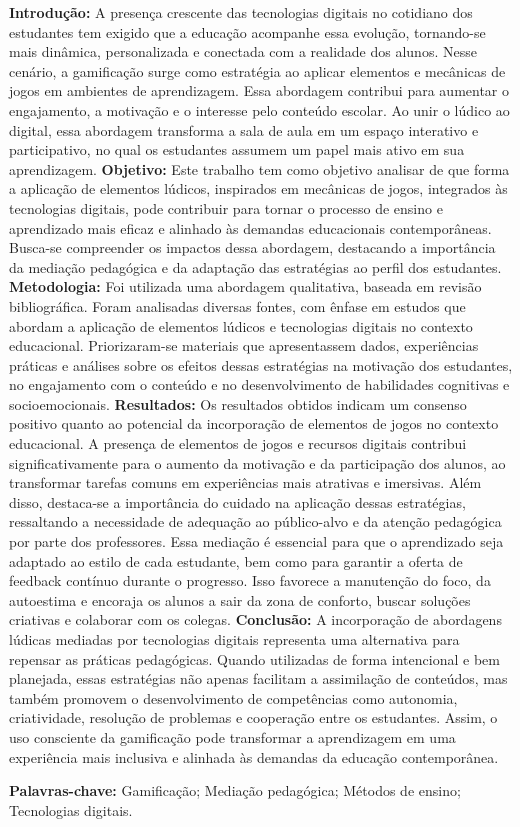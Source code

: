 \documentclass[12pt,a4paper]{article}
\begin{document}
\noindent
\textbf{Introdução:} A presença crescente das tecnologias digitais no cotidiano dos estudantes tem exigido que a educação acompanhe essa evolução, tornando-se mais dinâmica, personalizada e conectada com a realidade dos alunos. Nesse cenário, a gamificação surge como estratégia ao aplicar elementos e mecânicas de jogos em ambientes de aprendizagem. Essa abordagem contribui para aumentar o engajamento, a motivação e o interesse pelo conteúdo escolar. Ao unir o lúdico ao digital, essa abordagem transforma a sala de aula em um espaço interativo e participativo, no qual os estudantes assumem um papel mais ativo em sua aprendizagem. \textbf{Objetivo:} Este trabalho tem como objetivo analisar de que forma a aplicação de elementos lúdicos, inspirados em mecânicas de jogos, integrados às tecnologias digitais, pode contribuir para tornar o processo de ensino e aprendizado mais eficaz e alinhado às demandas educacionais contemporâneas. Busca-se compreender os impactos dessa abordagem, destacando a importância da mediação pedagógica e da adaptação das estratégias ao perfil dos estudantes. \textbf{Metodologia:} Foi utilizada uma abordagem qualitativa, baseada em revisão bibliográfica. Foram analisadas diversas fontes, com ênfase em estudos que abordam a aplicação de elementos lúdicos e tecnologias digitais no contexto educacional. Priorizaram-se materiais que apresentassem dados, experiências práticas e análises sobre os efeitos dessas estratégias na motivação dos estudantes, no engajamento com o conteúdo e no desenvolvimento de habilidades cognitivas e socioemocionais. \textbf{Resultados:} Os resultados obtidos indicam um consenso positivo quanto ao potencial da incorporação de elementos de jogos no contexto educacional. A presença de elementos de jogos e recursos digitais contribui significativamente para o aumento da motivação e da participação dos alunos, ao transformar tarefas comuns em experiências mais atrativas e imersivas. Além disso, destaca-se a importância do cuidado na aplicação dessas estratégias, ressaltando a necessidade de adequação ao público-alvo e da atenção pedagógica por parte dos professores. Essa mediação é essencial para que o aprendizado seja adaptado ao estilo de cada estudante, bem como para garantir a oferta de feedback contínuo durante o progresso. Isso favorece a manutenção do foco, da autoestima e encoraja os alunos a sair da zona de conforto, buscar soluções criativas e colaborar com os colegas. \textbf{Conclusão:} A incorporação de abordagens lúdicas mediadas por tecnologias digitais representa uma alternativa para repensar as práticas pedagógicas. Quando utilizadas de forma intencional e bem planejada, essas estratégias não apenas facilitam a assimilação de conteúdos, mas também promovem o desenvolvimento de competências como autonomia, criatividade, resolução de problemas e cooperação entre os estudantes. Assim, o uso consciente da gamificação pode transformar a aprendizagem em uma experiência mais inclusiva e alinhada às demandas da educação contemporânea.

\vspace{1em}

\noindent\textbf{Palavras-chave:} Gamificação; Mediação pedagógica; Métodos de ensino; Tecnologias digitais.
\end{document}
